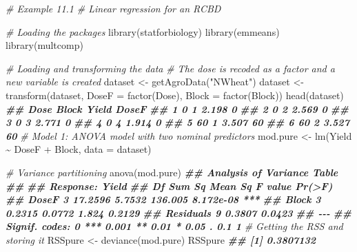 \documentclass[
  12pt,
]{book}
\newenvironment{Shaded}{\begin{snugshade}}{\end{snugshade}}
\newcommand{\AttributeTok}[1]{\textcolor[rgb]{0.77,0.63,0.00}{#1}}
\newcommand{\CommentTok}[1]{\textcolor[rgb]{0.56,0.35,0.01}{\textit{#1}}}
\newcommand{\DocumentationTok}[1]{\textcolor[rgb]{0.56,0.35,0.01}{\textbf{\textit{#1}}}}
\newcommand{\FunctionTok}[1]{\textcolor[rgb]{0.00,0.00,0.00}{#1}}
\newcommand{\NormalTok}[1]{#1}
\newcommand{\OtherTok}[1]{\textcolor[rgb]{0.56,0.35,0.01}{#1}}
\newcommand{\SpecialCharTok}[1]{\textcolor[rgb]{0.00,0.00,0.00}{#1}}
\newcommand{\StringTok}[1]{\textcolor[rgb]{0.31,0.60,0.02}{#1}}
\begin{document}
\begin{Shaded}
\begin{Highlighting}[]
\CommentTok{\# Example 11.1}
\CommentTok{\# Linear regression for an RCBD}

\CommentTok{\# Loading the packages}
\FunctionTok{library}\NormalTok{(statforbiology)}
\FunctionTok{library}\NormalTok{(emmeans)}
\FunctionTok{library}\NormalTok{(multcomp)}

\CommentTok{\# Loading and transforming the data}
\CommentTok{\# The dose is recoded as a factor and a new variable is created }
\NormalTok{dataset }\OtherTok{\textless{}{-}} \FunctionTok{getAgroData}\NormalTok{(}\StringTok{"NWheat"}\NormalTok{)}
\NormalTok{dataset }\OtherTok{\textless{}{-}} \FunctionTok{transform}\NormalTok{(dataset, }\AttributeTok{DoseF =} \FunctionTok{factor}\NormalTok{(Dose),}
                     \AttributeTok{Block =} \FunctionTok{factor}\NormalTok{(Block))}
\FunctionTok{head}\NormalTok{(dataset)}
\DocumentationTok{\#\#   Dose Block Yield DoseF}
\DocumentationTok{\#\# 1    0     1 2.198     0}
\DocumentationTok{\#\# 2    0     2 2.569     0}
\DocumentationTok{\#\# 3    0     3 2.771     0}
\DocumentationTok{\#\# 4    0     4 1.914     0}
\DocumentationTok{\#\# 5   60     1 3.507    60}
\DocumentationTok{\#\# 6   60     2 3.527    60}
\CommentTok{\# Model 1: ANOVA model with two nominal predictors}
\NormalTok{mod.pure }\OtherTok{\textless{}{-}} \FunctionTok{lm}\NormalTok{(Yield }\SpecialCharTok{\textasciitilde{}}\NormalTok{ DoseF }\SpecialCharTok{+}\NormalTok{ Block, }\AttributeTok{data =}\NormalTok{ dataset)}

\CommentTok{\# Variance partitioning}
\FunctionTok{anova}\NormalTok{(mod.pure)}
\DocumentationTok{\#\# Analysis of Variance Table}
\DocumentationTok{\#\# }
\DocumentationTok{\#\# Response: Yield}
\DocumentationTok{\#\#           Df  Sum Sq Mean Sq F value    Pr(\textgreater{}F)    }
\DocumentationTok{\#\# DoseF      3 17.2596  5.7532 136.005 8.172e{-}08 ***}
\DocumentationTok{\#\# Block      3  0.2315  0.0772   1.824    0.2129    }
\DocumentationTok{\#\# Residuals  9  0.3807  0.0423                      }
\DocumentationTok{\#\# {-}{-}{-}}
\DocumentationTok{\#\# Signif. codes:  0 \textquotesingle{}***\textquotesingle{} 0.001 \textquotesingle{}**\textquotesingle{} 0.01 \textquotesingle{}*\textquotesingle{} 0.05 \textquotesingle{}.\textquotesingle{} 0.1 \textquotesingle{} \textquotesingle{} 1}
\CommentTok{\# Getting the RSS and storing it}
\NormalTok{RSSpure }\OtherTok{\textless{}{-}} \FunctionTok{deviance}\NormalTok{(mod.pure)}
\NormalTok{RSSpure}
\DocumentationTok{\#\# [1] 0.3807132}
\end{Highlighting}
\end{Shaded}
\end{document}
